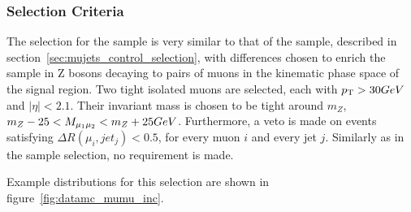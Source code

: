 \subsubsection{Selection Criteria}
The selection for the \mmj sample is very similar to that of the \mj sample, 
described in section~\ref{sec:mujets_control_selection}, with differences chosen
to enrich the sample in Z bosons decaying to pairs of muons in the kinematic 
phase space of the signal region. Two tight isolated muons are selected, each 
with ${p_{\text T}} > 30GeV$ and $|\eta| < 2.1$. Their invariant mass is chosen to be
tight around $m_Z$, $m_Z - 25 < M_{\mu_1\mu_2} < m_Z + 25 GeV$. Furthermore, a 
veto is made on events satisfying $\Delta R(\mu_i, jet_j) < 0.5$, for every muon 
$i$ and every jet $j$. Similarly as in the \mj sample selection, no \alphat
requirement is made.

Example distributions for this selection are shown in figure~\ref{fig:datamc_mumu_inc}.

